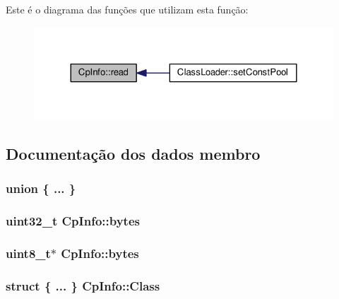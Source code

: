 Este é o diagrama das funções que utilizam esta função\+:
\nopagebreak
\begin{figure}[H]
\begin{center}
\leavevmode
\includegraphics[width=324pt]{class_cp_info_ab8c89df973cc40b407e0cdd4911923f1_icgraph}
\end{center}
\end{figure}




\subsection{Documentação dos dados membro}
\subsubsection[{\texorpdfstring{"@3}{@3}}]{\setlength{\rightskip}{0pt plus 5cm}union \{ ... \} }\hypertarget{class_cp_info_ac48d2f19350cfd3fb1d0c6a6b1537803}{}\label{class_cp_info_ac48d2f19350cfd3fb1d0c6a6b1537803}
\subsubsection[{\texorpdfstring{bytes}{bytes}}]{\setlength{\rightskip}{0pt plus 5cm}uint32\+\_\+t Cp\+Info\+::bytes}\hypertarget{class_cp_info_aff3858879ad5feb452a5fc0504e99c1b}{}\label{class_cp_info_aff3858879ad5feb452a5fc0504e99c1b}
\subsubsection[{\texorpdfstring{bytes}{bytes}}]{\setlength{\rightskip}{0pt plus 5cm}uint8\+\_\+t$\ast$ Cp\+Info\+::bytes}\hypertarget{class_cp_info_acdf9242daedb1b37c82f24e6665edb10}{}\label{class_cp_info_acdf9242daedb1b37c82f24e6665edb10}
\subsubsection[{\texorpdfstring{Class}{Class}}]{\setlength{\rightskip}{0pt plus 5cm}struct \{ ... \}   Cp\+Info\+::\+Class}\hypertarget{class_cp_info_a8e42eb58082f93477cecc14d96c50689}{}\label{class_cp_info_a8e42eb58082f93477cecc14d96c50689}
